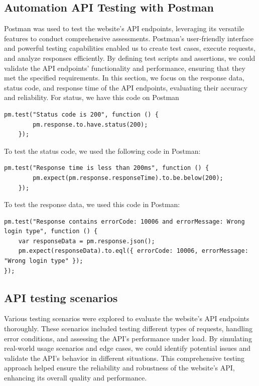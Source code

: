 \subsection{Automation API Testing with Postman}
Postman was used to test the website's API endpoints, leveraging its
versatile features to conduct comprehensive assessments. Postman's
user-friendly interface and powerful testing capabilities enabled us to
create test cases, execute requests, and analyze responses efficiently.
By defining test scripts and assertions, we could validate the API
endpoints' functionality and performance, ensuring that they met the
specified requirements.
In this section, we focus on the response data, status code, and response
time of the API endpoints, evaluating their accuracy and reliability.
For status, we have this code on Postman
\begin{lstlisting}[caption=Code to test status code, label={lst:status-code}]
    pm.test("Status code is 200", function () {
        pm.response.to.have.status(200);
    });
\end{lstlisting}
To test the status code, we used the following code in Postman:
\begin{lstlisting}[caption=Code to test response time, label={lst:response-time}]
    pm.test("Response time is less than 200ms", function () {
        pm.expect(pm.response.responseTime).to.be.below(200);
    });
\end{lstlisting}
To test the response data, we used this code in Postman:
\begin{lstlisting}[caption=Code to test response data, label={lst:response-data}]
    pm.test("Response contains errorCode: 10006 and errorMessage: Wrong login type", function () {
    var responseData = pm.response.json();
    pm.expect(responseData).to.eql({ errorCode: 10006, errorMessage: "Wrong login type" });
});
\end{lstlisting}

\subsection{API testing scenarios}
Various testing scenarios were explored to evaluate the website's API
endpoints thoroughly. These scenarios included testing different types of
requests, handling error conditions, and assessing the API's performance
under load. By simulating real-world usage scenarios and edge cases, we
could identify potential issues and validate the API's behavior in
different situations. This comprehensive testing approach helped ensure
the reliability and robustness of the website's API, enhancing its overall
quality and performance. 

